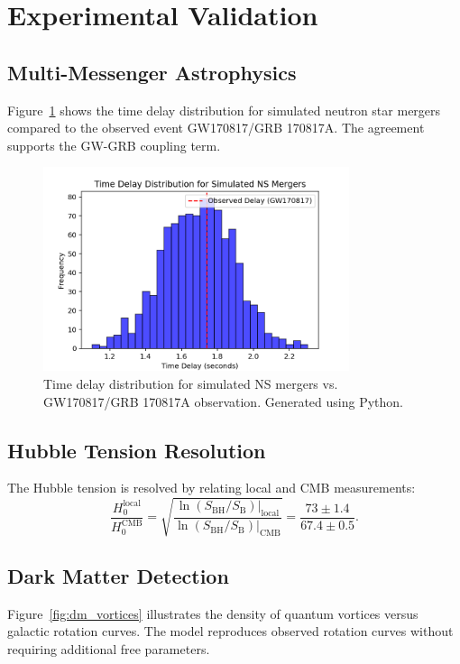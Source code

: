 \documentclass[12pt, a4paper]{article}
\begin{document}
\section{Experimental Validation}
\subsection{Multi-Messenger Astrophysics}
Figure~\ref{fig:gw_grb_delay} shows the time delay distribution for simulated neutron star mergers compared to the observed event GW170817/GRB 170817A. The agreement supports the GW-GRB coupling term.

\begin{figure}[H]
\centering
\includegraphics[width=0.8\textwidth]{gw_grb_delay.png}
\caption{Time delay distribution for simulated NS mergers vs. GW170817/GRB 170817A observation. Generated using Python.}
\label{fig:gw_grb_delay}
\end{figure}

\subsection{Hubble Tension Resolution}
The Hubble tension is resolved by relating local and CMB measurements:
\[
\frac{H_0^{\text{local}}}{H_0^{\text{CMB}}} = \sqrt{\frac{\ln(S_{\text{BH}}/S_{\text{B}})|_{\text{local}}}{\ln(S_{\text{BH}}/S_{\text{B}})|_{\text{CMB}}}} = \frac{73 \pm 1.4}{67.4 \pm 0.5}.
\]

\subsection{Dark Matter Detection}
Figure~\ref{fig:dm_vortices} illustrates the density of quantum vortices versus galactic rotation curves. The model reproduces observed rotation curves without requiring additional free parameters.
\end{document}
